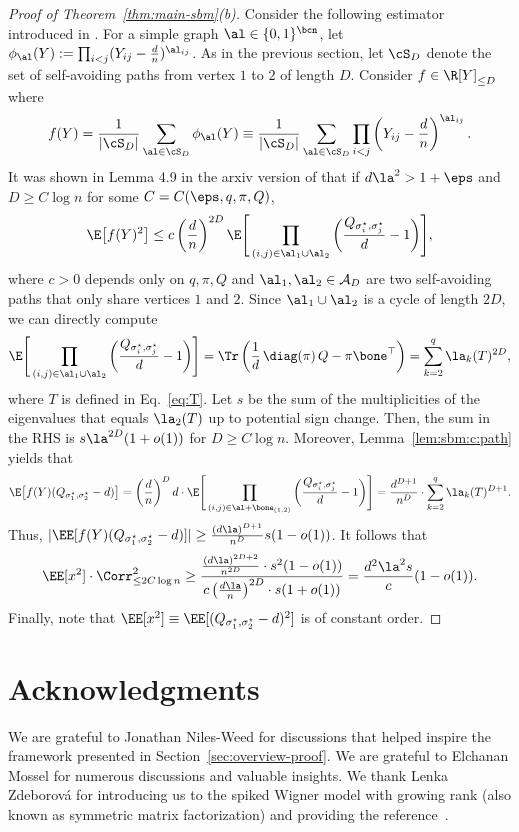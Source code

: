 \documentclass[11pt]{article}
\begin{document}
\begin{proof}[Proof of Theorem~\ref{thm:main-sbm}(b)]
Consider the following estimator introduced in \cite[Section 2]{HS-bayesian}. For a simple graph $\al\in \{0,1\}^{\bcn}$, let $\phi_{\al}(Y):=\prod_{i<j}(Y_{ij}-\frac{d}{n})^{\al_{ij}}$. As in the previous section, let $\cS_D$ denote the set of self-avoiding paths from vertex $1$ to $2$ of length $D$. Consider $f\in \R[Y]_{\le D}$ where
\[
f(Y)=\frac{1}{|\cS_D|}\sum_{\al\in \cS_D}\phi_{\al}(Y)\equiv \frac{1}{|\cS_D|}\sum_{\al\in \cS_D}\prod_{i<j}\left(Y_{ij}-\frac{d}{n}\right)^{\al_{ij}}.
\]
It was shown in Lemma 4.9 in the arxiv version of \cite{HS-bayesian} that if $d\la^2>1+\eps$ and $D\geq C \log n$ for some $C=C(\eps,q,\pi,Q)$,
\[
\E \big[f(Y)^2\big]\leq c\left(\frac{d}{n}\right)^{2D}\E \Bigg[\prod_{(i,j)\in \al_1\cup \al_2}\bigg(\frac{Q_{\sigma^\star_i,\sigma^\star_j}}{d}-1\bigg)\Bigg], 
\]
where $c > 0$ depends only on $q,\pi,Q$ and $\al_1,\al_2\in \mathcal{A}_D$ are two self-avoiding paths that only share vertices $1$ and $2$. Since $\al_1\cup\al_2$ is a cycle of length $2D$, we can directly compute
\[
\E \Bigg[\prod_{(i,j)\in \al_1\cup \al_2}\bigg(\frac{Q_{\sigma^\star_i,\sigma^\star_j}}{d}-1\bigg)\Bigg]=\Tr\left(\frac{1}{d}\,\diag(\pi)\,Q-\pi \bone^{\top}\right)=\sum_{k=2}^{q}\la_k(T)^{2D},
\]
where $T$ is defined in Eq.~\eqref{eq:T}. Let $s$ be the sum of the multiplicities of the eigenvalues that equals $\la_2(T)$ up to potential sign change. Then, the sum in the RHS is $s\la^{2D}(1+o(1))$ for $D\geq C\log n$. 
Moreover, Lemma~\ref{lem:sbm:c:path} yields that
\[
\E\big[f(Y)(Q_{\sigma^\star_1,\sigma^\star_2}-d)\big]=\left(\frac{d}{n}\right)^{D}d\cdot \E \Bigg[\prod_{(i,j)\in \al+\bone_{(1,2)}}\bigg(\frac{Q_{\sigma^\star_i,\sigma^\star_j}}{d}-1\bigg)\Bigg]=\frac{d^{D+1}}{n^D}\cdot \sum_{k=2}^{q}\la_k(T)^{D+1}.
\]
Thus, $|\EE[f(Y)(Q_{\sigma^\star_1,\sigma^\star_2}-d)]|\geq \frac{(d\la)^{D+1}}{n^{D}}s(1-o(1))$. It follows that
\[
\EE[x^2] \cdot \Corr_{\leq 2C\log n}^{2}\geq  \frac{\frac{(d\la)^{2D+2}}{n^{2D}} \cdot s^2(1-o(1))}{c\left(\frac{d\la}{n}\right)^{2D}\cdot s(1+o(1))}=\frac{d^2\la^2 s}{c}(1-o(1)).
\]
Finally, note that $\EE[x^2] \equiv \EE[(Q_{\sigma^\star_1,\sigma^\star_2}-d)^2]$ is of constant order.
\end{proof}




\section*{Acknowledgments}
We are grateful to Jonathan Niles-Weed for discussions that helped inspire the framework presented in Section~\ref{sec:overview-proof}. We are grateful to Elchanan Mossel for numerous discussions and valuable insights. We thank Lenka Zdeborov{\'a} for introducing us to the spiked Wigner model with growing rank (also known as symmetric matrix factorization) and providing the reference~\cite{extensive-rank}.




\end{document}
